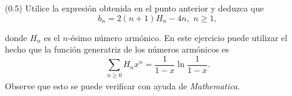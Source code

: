 (0.5) Utilice la expresión obtenida en el punto anterior y deduzca que
            \begin{equation}
                b_n=2(n+1)H_n-4n,\,\,n\geq1,
            \end{equation}
            
            donde $H_n$ es el $n$-ésimo número armónico. En este ejercicio puede utilizar el hecho que la función generatriz de los números armónicos es
            \begin{equation}
                \sum_{n\geq0}H_nx^n=\frac{1}{1-x}\ln \frac{1}{1-x}.
            \end{equation}
            Observe que esto se puede verificar con ayuda de \textit{Mathematica}\textsuperscript{\textregistered}.